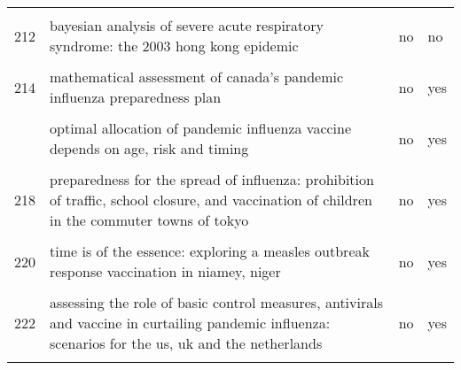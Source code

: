 \documentclass[
]{article}
\begin{document}
\begin{landscape}
\begin{longtable}{l>{\raggedright\arraybackslash}p{4cm}l>{\raggedright\arraybackslash}p{4cm}}
\addlinespace
\cellcolor{gray!6}{211} & \cellcolor{gray!6}{the transmissibility and control of pandemic influenza a (h1n1) virus} & \cellcolor{gray!6}{no} & \cellcolor{gray!6}{yes}\\
212 & bayesian analysis of severe acute respiratory syndrome: the 2003 hong kong epidemic & no & no\\
\cellcolor{gray!6}{213} & \cellcolor{gray!6}{hepatitis b vaccination and changes in sexual risk behaviour among men who have sex with men in amsterdam} & \cellcolor{gray!6}{no} & \cellcolor{gray!6}{yes}\\
214 & mathematical assessment of canada's pandemic influenza preparedness plan & no & yes\\
\cellcolor{gray!6}{215} & \cellcolor{gray!6}{modeling targeted layered containment of an influenza pandemic in the united states} & \cellcolor{gray!6}{no} & \cellcolor{gray!6}{no}\\
\addlinespace
216 & optimal allocation of pandemic influenza vaccine depends on age, risk and timing & no & yes\\
\cellcolor{gray!6}{217} & \cellcolor{gray!6}{pandemic simulation of antivirals plus school closures: buying time until strain-specific vaccine is available} & \cellcolor{gray!6}{no} & \cellcolor{gray!6}{yes}\\
218 & preparedness for the spread of influenza: prohibition of traffic, school closure, and vaccination of children in the commuter towns of tokyo & no & yes\\
\cellcolor{gray!6}{219} & \cellcolor{gray!6}{scenarios of diffusion and control of an influenza pandemic in italy} & \cellcolor{gray!6}{no} & \cellcolor{gray!6}{yes}\\
220 & time is of the essence: exploring a measles outbreak response vaccination in niamey, niger & no & yes\\
\addlinespace
\cellcolor{gray!6}{221} & \cellcolor{gray!6}{a stochastic equation-based model of the value of international air-travel restrictions for controlling pandemic flu} & \cellcolor{gray!6}{no} & \cellcolor{gray!6}{no}\\
222 & assessing the role of basic control measures, antivirals and vaccine in curtailing pandemic influenza: scenarios for the us, uk and the netherlands & no & yes\\
\cellcolor{gray!6}{223} & \cellcolor{gray!6}{deterministic sir (susceptible–infected–removed) models applied to varicella outbreaks} & \cellcolor{gray!6}{no} & \cellcolor{gray!6}{yes}\\

\end{longtable}
\end{landscape}
\end{document}
